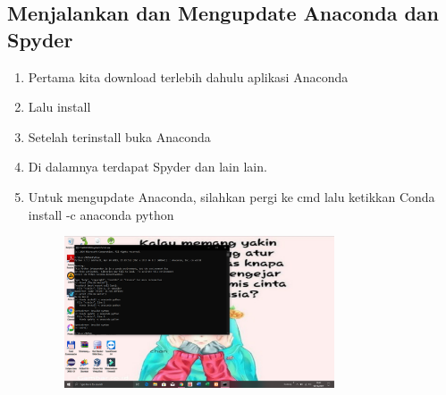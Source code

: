 \documentclass{article}
\begin{document}
\subsection{Menjalankan dan Mengupdate Anaconda dan Spyder}
\begin{enumerate}
    \item Pertama kita download terlebih dahulu aplikasi Anaconda
    \item Lalu install
    \item Setelah terinstall buka Anaconda
    \item Di dalamnya terdapat Spyder dan lain lain.
    \item Untuk mengupdate Anaconda, silahkan pergi ke cmd lalu ketikkan Conda install -c anaconda python
        \begin{figure}[h]
            \centerline{\includegraphics[width=8cm]{image/anacondaupdt.png}}
        \end{figure}
\end{enumerate}
\end{document}
